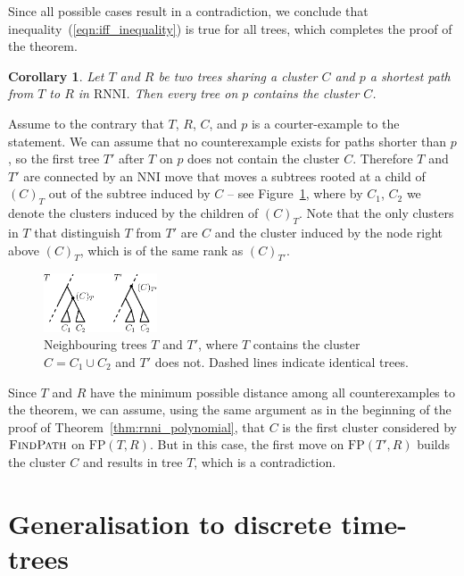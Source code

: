 \documentclass[11pt]{amsart}
\newtheorem{corollary}{Corollary}
\newcommand{\rnni}{\mathrm{RNNI}}
\newcommand{\findpath}{\textsc{FindPath}}
\newcommand{\nni}{\mathrm{NNI}}
\newcommand{\fp}{\mathrm{FP}}
\newcommand{\summary}[1]{} %
\begin{document}
Since all possible cases result in a contradiction, we conclude that inequality~(\ref{eqn:iff_inequality}) is true for all trees, which completes the proof of the theorem.
\endproof

\summary{Proving the Cluster Property for $\rnni$}

\begin{corollary}
	Let $T$ and $R$ be two trees sharing a cluster $C$ and $p$ a shortest path from $T$ to $R$ in $\rnni$.
	Then every tree on $p$ contains the cluster $C$.
	\label{cluster_thm}
\end{corollary}

\proof
	Assume to the contrary that $T$, $R$, $C$, and $p$ is a courter-example to the statement.
	We can assume that no counterexample exists for paths shorter than $p$, so the first tree $T'$ after $T$ on $p$ does not contain the cluster $C$.
	Therefore $T$ and $T'$ are connected by an $\nni$ move that moves a subtrees rooted at a child of $(C)_T$ out of the subtree induced by $C$ -- see Figure~\ref{fig:cluster_thm_proof}, where by $C_1$, $C_2$ we denote the clusters induced by the children of $(C)_T$.
	Note that the only clusters in $T$ that distinguish $T$ from $T'$ are $C$ and the cluster induced by the node right above $(C)_{T}$, which is of the same rank as $(C)_{T'}$.

	\begin{figure}[!hbt]
	\centering
	\includegraphics[width=0.3\textwidth]{cluster_thm_proof}
	\caption{Neighbouring trees $T$ and $T'$, where $T$ contains the cluster $C = C_1 \cup C_2$ and $T'$ does not.
	Dashed lines indicate identical trees.}
	\label{fig:cluster_thm_proof}
	\end{figure}

	Since $T$ and $R$ have the minimum possible distance among all counterexamples to the theorem, we can assume, using the same argument as in the beginning of the proof of Theorem~\ref{thm:rnni_polynomial}, that $C$ is the first cluster considered by $\findpath$ on $\fp(T, R)$.
	But in this case, the first move on $\fp(T',R)$ builds the cluster $C$ and results in tree $T$, which is a contradiction.
\endproof


\section{Generalisation to discrete time-trees}
\end{document}
